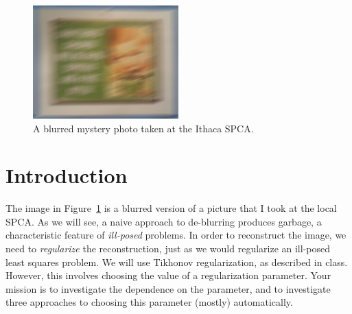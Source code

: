 \documentclass[12pt, leqno]{article} %
\begin{document}

\begin{figure}
\begin{center}
\includegraphics[width=0.5\textwidth]{proj2code/blurry.png}
\end{center}
\caption{A blurred mystery photo taken at the Ithaca SPCA.}
\label{fig1}
\end{figure}

\section{Introduction}

The image in Figure~\ref{fig1} is a blurred version of a picture that
I took at the local SPCA.  As we will see, a naive approach to
de-blurring produces garbage, a characteristic feature of {\em ill-posed}
problems.  In order to reconstruct the image, we need to {\em regularize}
the reconstruction, just as we would regularize an ill-posed least squares
problem.  We will use Tikhonov regularization, as described in class.
However, this involves choosing the value of a
regularization parameter.  Your mission is to investigate the dependence
on the parameter, and to investigate three approaches to
choosing this parameter (mostly) automatically.
\end{document}
